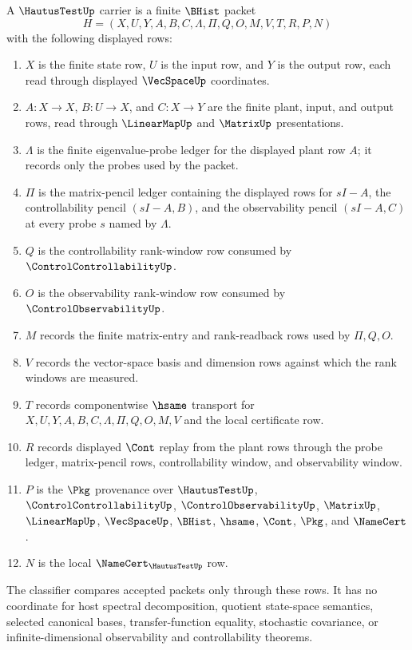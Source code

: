 \begin{definition}
\label{def:hautus-test-carrier}
A $\HautusTestUp$ carrier is a finite $\BHist$ packet
$$
H=(X,U,Y,A,B,C,\Lambda,\Pi,Q,O,M,V,T,R,P,N)
$$
with the following displayed rows:
\begin{enumerate}
\item $X$ is the finite state row, $U$ is the input row, and $Y$ is the output row, each read through displayed $\VecSpaceUp$ coordinates.
\item $A:X\to X$, $B:U\to X$, and $C:X\to Y$ are the finite plant, input, and output rows, read through $\LinearMapUp$ and $\MatrixUp$ presentations.
\item $\Lambda$ is the finite eigenvalue-probe ledger for the displayed plant row $A$; it records only the probes used by the packet.
\item $\Pi$ is the matrix-pencil ledger containing the displayed rows for $sI-A$, the controllability pencil $(sI-A,B)$, and the observability pencil $(sI-A,C)$ at every probe $s$ named by $\Lambda$.
\item $Q$ is the controllability rank-window row consumed by $\ControlControllabilityUp$.
\item $O$ is the observability rank-window row consumed by $\ControlObservabilityUp$.
\item $M$ records the finite matrix-entry and rank-readback rows used by $\Pi,Q,O$.
\item $V$ records the vector-space basis and dimension rows against which the rank windows are measured.
\item $T$ records componentwise $\hsame$ transport for $X,U,Y,A,B,C,\Lambda,\Pi,Q,O,M,V$ and the local certificate row.
\item $R$ records displayed $\Cont$ replay from the plant rows through the probe ledger, matrix-pencil rows, controllability window, and observability window.
\item $P$ is the $\Pkg$ provenance over $\HautusTestUp$, $\ControlControllabilityUp$, $\ControlObservabilityUp$, $\MatrixUp$, $\LinearMapUp$, $\VecSpaceUp$, $\BHist$, $\hsame$, $\Cont$, $\Pkg$, and $\NameCert$.
\item $N$ is the local $\NameCert_{\HautusTestUp}$ row.
\end{enumerate}
The classifier compares accepted packets only through these rows. It has no coordinate for host spectral decomposition, quotient state-space semantics, selected canonical bases, transfer-function equality, stochastic covariance, or infinite-dimensional observability and controllability theorems.
\end{definition}

